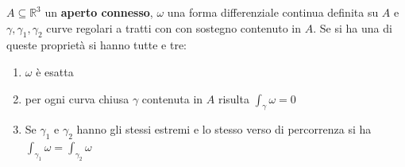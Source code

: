 \documentclass[a4paper, oneside]{article}
\begin{document}
\begin{theorem}
     $A \subseteq \mathbb{R}^3$ un \textbf{aperto connesso}, $\omega$ una forma differenziale continua definita su $A$ e $\gamma,\gamma_1,\gamma_2$ curve regolari a tratti con con sostegno contenuto in $A$. Se si ha una di queste proprietà si hanno tutte e tre:
    \begin{enumerate}
        \item $\omega$ è esatta
        \item per ogni curva chiusa $\gamma$ contenuta in $A$ risulta $\int_{\gamma} \omega = 0$
        \item Se $\gamma_1$ e $\gamma_2$ hanno gli stessi estremi e lo stesso verso di percorrenza si ha $\int_{\gamma_1} \omega = \int_{\gamma_2} \omega$
    \end{enumerate} 
\end{theorem}
\end{document}
